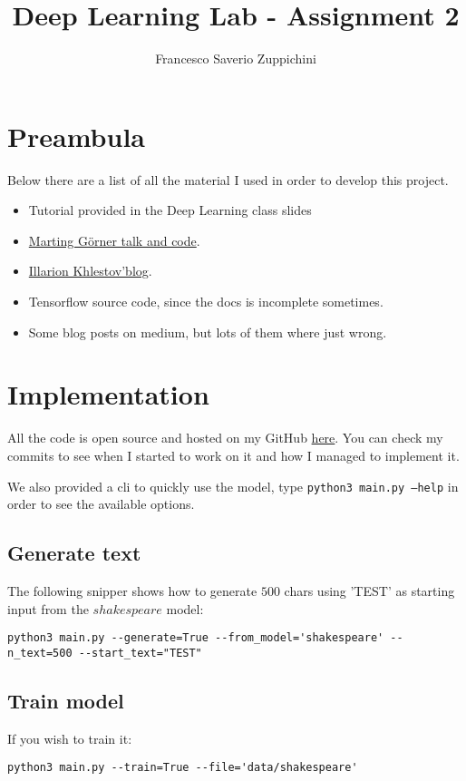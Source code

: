 \documentclass[11pt]{article}
\title{Deep Learning Lab - Assignment 2}
\author{Francesco Saverio Zuppichini}
\begin{document}
\maketitle
\section{Preambula}
Below there are a list of all the material I used in order to develop this project. 
\begin{itemize}
	\item Tutorial provided in the Deep Learning class slides
	\item \href{https://www.youtube.com/watch?v=vq2nnJ4g6N0}{Marting Görner talk and code}.
	\item \href{https://ikhlestov.github.io/pages/machine-learning/tensorflow-hints/}{Illarion Khlestov'blog}.
	\item Tensorflow source code, since the docs is incomplete sometimes.
	\item Some blog posts on medium, but lots of them where just wrong. 
 \end{itemize}
\section{Implementation}
All the code is open source and hosted on my GitHub \href{https://github.com/FrancescoSaverioZuppichini/LSTM-Text-Generator}{here}. You can check my commits to see when I started to work on it and how I managed to implement it.

We also provided a cli to quickly use the model, type \texttt{python3 main.py --help} in order to see the available options.
\subsection{Generate text}
The following snipper shows how to generate $500$ chars using 'TEST' as starting input from the $shakespeare$ model:
\begin{lstlisting}[breaklines=true]
python3 main.py --generate=True --from_model='shakespeare' --n_text=500 --start_text="TEST"	
\end{lstlisting}
\subsection{Train model}
If you wish to train it:
\begin{lstlisting}[breaklines=true]
python3 main.py --train=True --file='data/shakespeare'	
\end{lstlisting}
\end{document}
